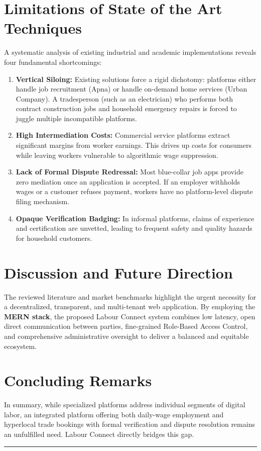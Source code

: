 \section{Limitations of State of the Art Techniques}
A systematic analysis of existing industrial and academic implementations reveals four fundamental shortcomings:
\begin{enumerate}
    \item \textbf{Vertical Siloing:} Existing solutions force a rigid dichotomy: platforms either handle job recruitment (Apna) or handle on-demand home services (Urban Company). A tradesperson (such as an electrician) who performs both contract construction jobs and household emergency repairs is forced to juggle multiple incompatible platforms.
    \item \textbf{High Intermediation Costs:} Commercial service platforms extract significant margins from worker earnings. This drives up costs for consumers while leaving workers vulnerable to algorithmic wage suppression.
    \item \textbf{Lack of Formal Dispute Redressal:} Most blue-collar job apps provide zero mediation once an application is accepted. If an employer withholds wages or a customer refuses payment, workers have no platform-level dispute filing mechanism.
    \item \textbf{Opaque Verification Badging:} In informal platforms, claims of experience and certification are unvetted, leading to frequent safety and quality hazards for household customers.
\end{enumerate}

\section{Discussion and Future Direction}
The reviewed literature and market benchmarks highlight the urgent necessity for a decentralized, transparent, and multi-tenant web application. By employing the \textbf{MERN stack}, the proposed Labour Connect system combines low latency, open direct communication between parties, fine-grained Role-Based Access Control, and comprehensive administrative oversight to deliver a balanced and equitable ecosystem.

\section{Concluding Remarks}
In summary, while specialized platforms address individual segments of digital labor, an integrated platform offering both daily-wage employment and hyperlocal trade bookings with formal verification and dispute resolution remains an unfulfilled need. Labour Connect directly bridges this gap.

\vspace{10mm}
\hrule
